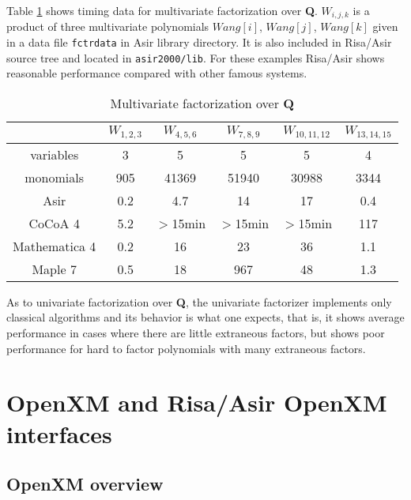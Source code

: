 \documentclass[runningheads]{cl2emult}
\begin{document}
Table \ref{multifac} shows timing data for multivariate
factorization over {\bf Q}.
$W_{i,j,k}$ is a product of three multivariate polynomials 
$Wang[i]$, $Wang[j]$, $Wang[k]$ given in a data file
{\tt fctrdata} in Asir library directory. It is also included
in Risa/Asir source tree and located in {\tt asir2000/lib}.
For these examples Risa/Asir shows reasonable performance
compared with other famous systems. 
\begin{table}[hbtp]
\begin{center}
\begin{tabular}{|c||c|c|c|c|c|} \hline
	& $W_{1,2,3}$ & $W_{4,5,6}$ & $W_{7,8,9}$ & $W_{10,11,12}$ & $W_{13,14,15}$ \\ \hline
variables & 3 & 5 & 5 & 5 & 4 \\ \hline
monomials & 905 & 41369 & 51940 & 30988 & 3344 \\ \hline\hline
Asir 	& 0.2 & 4.7 & 14 & 17 & 0.4 \\ \hline
CoCoA 4 & 5.2 & $>$15min 	& $>$15min & $>$15min & 117 \\ \hline\hline
Mathematica 4& 0.2 	& 16 	& 23 & 36 & 1.1 \\ \hline
Maple 7& 0.5 	& 18 	& 967  & 48 & 1.3 \\ \hline
\end{tabular}
\end{center}
\caption{Multivariate factorization over {\bf Q}}
\label{multifac}
\end{table}
As to univariate factorization over {\bf Q},
the univariate factorizer implements only classical
algorithms and its behavior is what one expects,
that is, it shows average performance in cases
where there are little extraneous factors, but
shows poor performance for hard to factor polynomials with
many extraneous factors.

\section{OpenXM and Risa/Asir OpenXM interfaces}

\subsection{OpenXM overview}
\end{document}
